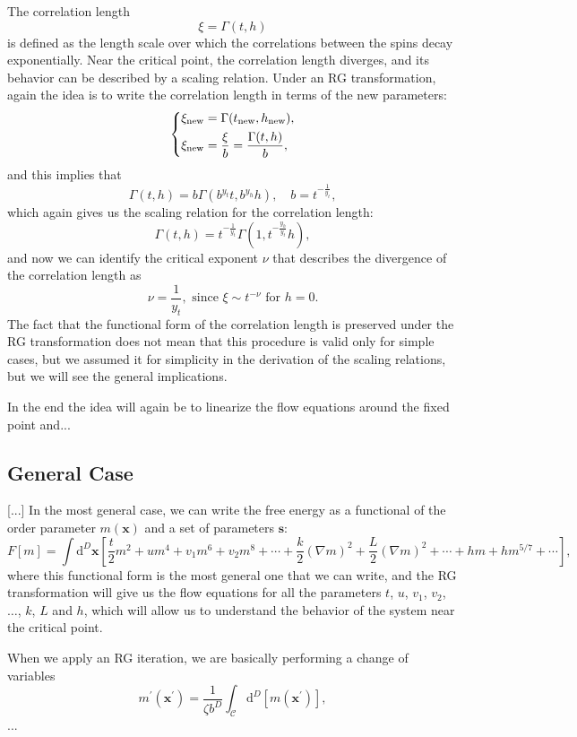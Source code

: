 The correlation length
\[
    \xi = \Gamma(t,h)
\]
is defined as the length scale over which the correlations between the spins decay exponentially. Near the critical point, the correlation length diverges, and its behavior can be described by a scaling relation. Under an RG transformation, again the idea is to write the correlation length in terms of the new parameters:
\[
    \begin{dcases}
        \xi_{\text{new}} = \Gamma(t_{\text{new}}, h_{\text{new}}), \\
        \xi_{\text{new}} = \frac{\xi}{b} = \frac{\Gamma(t,h)}{b},
    \end{dcases}
\]
and this implies that
\[
    \Gamma(t,h) = b \Gamma(b^{y_t} t, b^{y_h} h), \quad b = t^{-\frac{1}{y_t}},
\]
which again gives us the scaling relation for the correlation length:
\[
    \Gamma(t,h) = t^{-\tfrac{1}{y_t}} \Gamma(1, t^{-\tfrac{y_h}{y_t}} h),
\]
and now we can identify the critical exponent \(\nu\) that describes the divergence of the correlation length as
\[
    \nu = \frac{1}{y_t}, \text{ since } \xi \sim t^{-\nu} \text{ for } h = 0.
\]
The fact that the functional form of the correlation length is preserved under the RG transformation does not mean that this procedure is valid only for simple cases, but we assumed it for simplicity in the derivation of the scaling relations, but we will see the general implications.

In the end the idea will again be to linearize the flow equations around the fixed point and...

\subsection{General Case}

[...]
In the most general case, we can write the free energy as a functional of the order parameter \(m(\mathbf{x})\) and a set of parameters \(\mathbf{s}\):
\[
    F[m] = \int \mathrm{d}^D \mathbf{x} \left[ \frac{t}{2} m^2 + u m^4 + v_1 m^6 + v_2 m^8 + \cdots + \frac{k}{2} (\nabla m)^2 + \frac{L}{2} (\nabla m)^2 + \cdots + hm + h m^{5 / 7}+ \cdots\right],
\]
where this functional form is the most general one that we can write, and the RG transformation will give us the flow equations for all the parameters \(t\), \(u\), \(v_1\), \(v_2\), \(\dots\), \(k\), \(L\) and \(h\), which will allow us to understand the behavior of the system near the critical point.

When we apply an RG iteration, we are basically performing a change of variables
\[
    m^{\prime}(\mathbf{x}^{\prime}) = \frac{1}{\zeta b^{D}} \int_{\mathcal{C}} \mathrm{d}^D [m(\mathbf{x}^{\prime})],
\]
...


